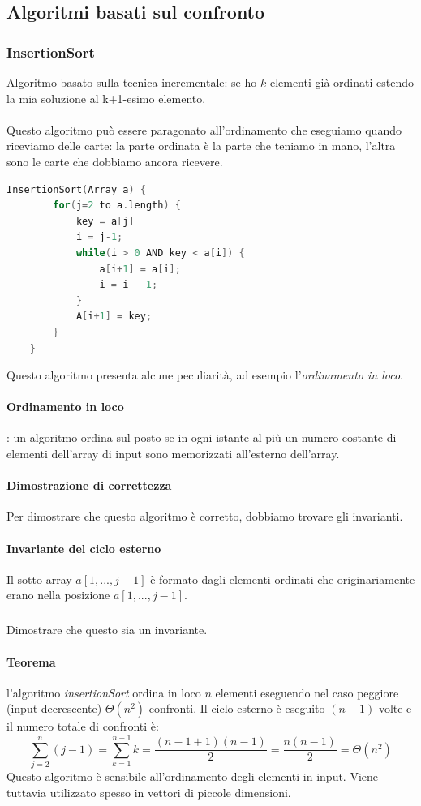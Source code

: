\documentclass[italian]{article}
\newcommand{\homeExercize}{\text{\faHome $\;$ Esercizio per casa}}
\begin{document}
\subsection{Algoritmi basati sul confronto}
\subsubsection{InsertionSort}
Algoritmo basato sulla tecnica incrementale: se ho $k$ elementi già ordinati estendo la mia soluzione al k+1-esimo elemento.\\\\
Questo algoritmo può essere paragonato all'ordinamento che eseguiamo quando riceviamo delle carte: la parte ordinata è la parte che teniamo in mano, l’altra sono le carte che dobbiamo ancora ricevere.
\begin{lstlisting}[language=c,mathescape=true]
	InsertionSort(Array a) {
		for(j=2 to a.length) {
			key = a[j]
			i = j-1;    
			while(i > 0 AND key < a[i]) {
				a[i+1] = a[i];
				i = i - 1;
			}
			A[i+1] = key;
		}
	}
\end{lstlisting}
Questo algoritmo presenta alcune peculiarità, ad esempio l'\textit{ordinamento in loco}.
\paragraph{Ordinamento in loco}: un algoritmo ordina sul posto se in ogni istante al più un numero costante di elementi dell’array di input sono memorizzati all’esterno dell’array.

\paragraph{Dimostrazione di correttezza}
Per dimostrare che questo algoritmo è corretto, dobbiamo trovare gli invarianti.

\paragraph{Invariante del ciclo esterno} Il sotto-array $a[1,..., j-1]$ è formato dagli elementi ordinati che originariamente erano nella posizione $a[1,..., j-1]$. 
\subparagraph{\homeExercize} Dimostrare che questo sia un invariante.

\paragraph{Teorema} l’algoritmo \textit{insertionSort} ordina in loco $n$ elementi eseguendo nel caso peggiore (input decrescente) $\varTheta(n^2)$ confronti. Il ciclo esterno è eseguito $(n-1)$ volte e il numero totale di confronti è:
\[
	\sum_{j=2}^{n} (j-1) = \sum_{k=1}^{n-1} k = \dfrac{(n-1+1)(n-1)}{2} = \dfrac{n(n-1)}{2} = \varTheta(n^2)
\]
Questo algoritmo è sensibile all’ordinamento degli elementi in input. Viene tuttavia utilizzato spesso in vettori di piccole dimensioni.
\end{document}
